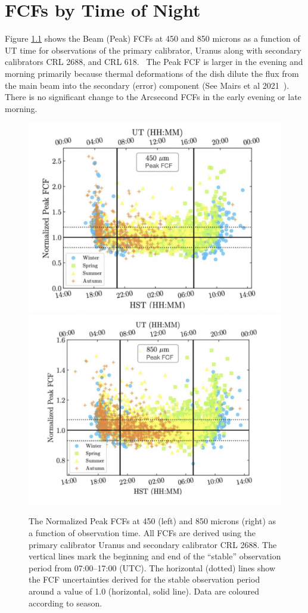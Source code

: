 \chapter{FCFs by Time of Night}
\label{app:fcfstime}

Figure \ref{fig:FCFsTimeOfNight} shows the Beam (Peak) FCFs at 
450 and 850 microns as a function of UT time for observations of the 
primary calibrator, Uranus along with secondary calibrators CRL 2688, and CRL 618.  
The Peak FCF is larger in the evening and morning primarily because thermal 
deformations of the dish dilute the flux from the main beam into the secondary 
(error) component (See Mairs et al 2021~\cite{mairs21}). There is no significant 
change to the Arcsecond FCFs in the early evening or late morning.

\begin{figure}
\begin{center}
\includegraphics[width=0.47\linewidth]{sc21-FCFsTimeOfNight-450} \hspace{0.02\linewidth}
\includegraphics[width=0.47\linewidth]{sc21-FCFsTimeOfNight-850}
\caption[FCFs Time of Night]{The Normalized Peak FCFs at 450 (left) and 850 microns (right) 
as a function of observation time. All FCFs are derived using the primary calibrator Uranus and 
secondary calibrator CRL 2688. The vertical lines mark the beginning and end of the “stable” observation 
period from 07:00–17:00 (UTC). The horizontal (dotted) lines show the FCF uncertainties derived for the 
stable observation period around a value of 1.0 (horizontal, solid line). 
Data are coloured according to season. \label{fig:FCFsTimeOfNight}}
\end{center}
\end{figure}

